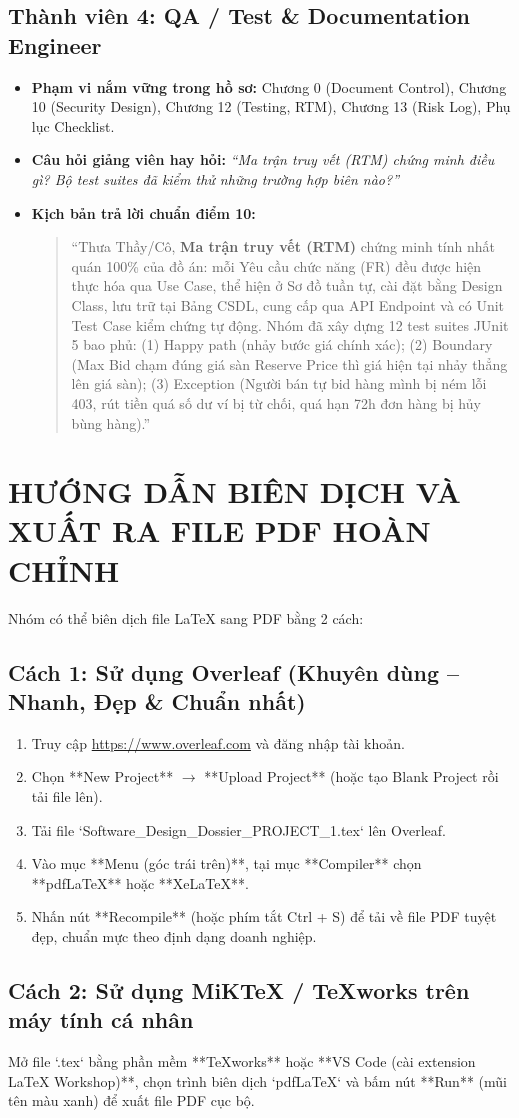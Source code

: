 \documentclass[11pt,a4paper]{article}
\begin{document}
\subsection{Thành viên 4: QA / Test \& Documentation Engineer}
\begin{itemize}[leftmargin=*]
    \item \textbf{Phạm vi nắm vững trong hồ sơ:} Chương 0 (Document Control), Chương 10 (Security Design), Chương 12 (Testing, RTM), Chương 13 (Risk Log), Phụ lục Checklist.
    \item \textbf{Câu hỏi giảng viên hay hỏi:} \textit{``Ma trận truy vết (RTM) chứng minh điều gì? Bộ test suites đã kiểm thử những trường hợp biên nào?''}
    \item \textbf{Kịch bản trả lời chuẩn điểm 10:}
    \begin{quote}
        \small ``Thưa Thầy/Cô, \textbf{Ma trận truy vết (RTM)} chứng minh tính nhất quán 100\% của đồ án: mỗi Yêu cầu chức năng (FR) đều được hiện thực hóa qua Use Case, thể hiện ở Sơ đồ tuần tự, cài đặt bằng Design Class, lưu trữ tại Bảng CSDL, cung cấp qua API Endpoint và có Unit Test Case kiểm chứng tự động. Nhóm đã xây dựng 12 test suites JUnit 5 bao phủ: (1) Happy path (nhảy bước giá chính xác); (2) Boundary (Max Bid chạm đúng giá sàn Reserve Price thì giá hiện tại nhảy thẳng lên giá sàn); (3) Exception (Người bán tự bid hàng mình bị ném lỗi 403, rút tiền quá số dư ví bị từ chối, quá hạn 72h đơn hàng bị hủy bùng hàng).''
    \end{quote}
\end{itemize}

\section{HƯỚNG DẪN BIÊN DỊCH VÀ XUẤT RA FILE PDF HOÀN CHỈNH}

Nhóm có thể biên dịch file LaTeX sang PDF bằng 2 cách:

\subsection{Cách 1: Sử dụng Overleaf (Khuyên dùng -- Nhanh, Đẹp \& Chuẩn nhất)}
\begin{enumerate}
    \item Truy cập \url{https://www.overleaf.com} và đăng nhập tài khoản.
    \item Chọn **New Project** $\rightarrow$ **Upload Project** (hoặc tạo Blank Project rồi tải file lên).
    \item Tải file `Software_Design_Dossier_PROJECT_1.tex` lên Overleaf.
    \item Vào mục **Menu (góc trái trên)**, tại mục **Compiler** chọn **pdfLaTeX** hoặc **XeLaTeX**.
    \item Nhấn nút **Recompile** (hoặc phím tắt Ctrl + S) để tải về file PDF tuyệt đẹp, chuẩn mực theo định dạng doanh nghiệp.
\end{enumerate}

\subsection{Cách 2: Sử dụng MiKTeX / TeXworks trên máy tính cá nhân}
Mở file `.tex` bằng phần mềm **TeXworks** hoặc **VS Code (cài extension LaTeX Workshop)**, chọn trình biên dịch `pdfLaTeX` và bấm nút **Run** (mũi tên màu xanh) để xuất file PDF cục bộ.
\end{document}
